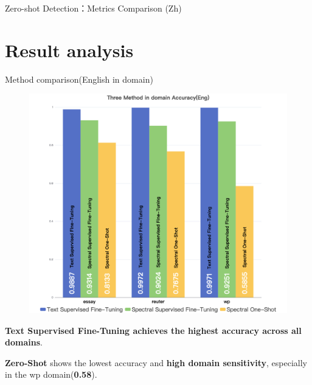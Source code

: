 \documentclass[serif]{beamer}
\begin{document}
\begin{frame}{Zero-shot  Detection：Metrics Comparison (Zh)}
\centering
\tiny
\setlength{\tabcolsep}{2pt}
\renewcommand{\arraystretch}{1.0}
\vspace{0.3cm}
\vspace{0.1cm}
{\scriptsize {}}

\centering
\tiny
\setlength{\tabcolsep}{2pt}
\renewcommand{\arraystretch}{1.0}
\vspace{0.3cm}
\vspace{0.1cm}
{\scriptsize {}}
\end{frame}


\section{Result analysis}
\begin{frame}{Method comparison(English in domain)}
\begin{figure}
    \centering
    \includegraphics[width=0.5\linewidth]{images/Three Method in domain Accuracy(Eng).png}
\end{figure}
\small{
\begin{item}
    \item \textbf{Text Supervised Fine-Tuning achieves the highest accuracy across all domains}.
    
    \item  \textbf{Zero-Shot} shows the lowest accuracy and \textbf{high domain sensitivity}, especially in the wp domain(\textbf{0.58}).
\end{item}
}
\end{frame}
\end{document}
